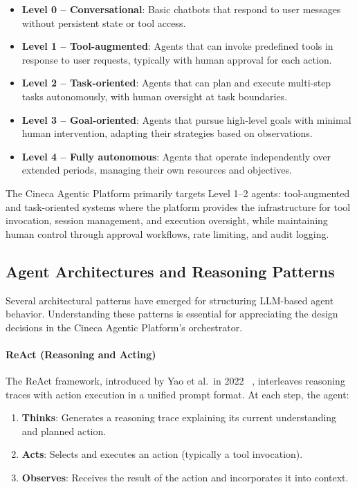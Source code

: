 \begin{itemize}
    \item \textbf{Level 0 -- Conversational}: Basic chatbots that respond to user messages without persistent state or tool access.
    \item \textbf{Level 1 -- Tool-augmented}: Agents that can invoke predefined tools in response to user requests, typically with human approval for each action.
    \item \textbf{Level 2 -- Task-oriented}: Agents that can plan and execute multi-step tasks autonomously, with human oversight at task boundaries.
    \item \textbf{Level 3 -- Goal-oriented}: Agents that pursue high-level goals with minimal human intervention, adapting their strategies based on observations.
    \item \textbf{Level 4 -- Fully autonomous}: Agents that operate independently over extended periods, managing their own resources and objectives.
\end{itemize}

The Cineca Agentic Platform primarily targets Level 1--2 agents: tool-augmented and task-oriented systems where the platform provides the infrastructure for tool invocation, session management, and execution oversight, while maintaining human control through approval workflows, rate limiting, and audit logging.

\subsection{Agent Architectures and Reasoning Patterns}

Several architectural patterns have emerged for structuring LLM-based agent behavior. Understanding these patterns is essential for appreciating the design decisions in the Cineca Agentic Platform's orchestrator.

\paragraph{ReAct (Reasoning and Acting)}
The ReAct framework, introduced by Yao et al.\ in 2022~%
, interleaves reasoning traces with action execution in a unified prompt format. At each step, the agent:
\begin{enumerate}
    \item \textbf{Thinks}: Generates a reasoning trace explaining its current understanding and planned action.
    \item \textbf{Acts}: Selects and executes an action (typically a tool invocation).
    \item \textbf{Observes}: Receives the result of the action and incorporates it into context.
\end{enumerate}

